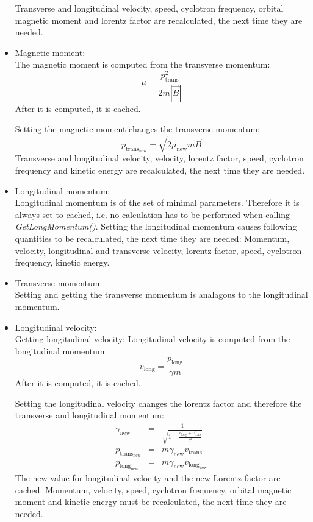 \begin{itemize}
		Transverse and longitudinal velocity, speed, cyclotron frequency, orbital magnetic moment and lorentz factor are recalculated, the next time they are needed.

		\item Magnetic moment:\\
		The magnetic moment is computed from the transverse momentum:
		\begin{equation}
			\mu = \frac{p_{\mathrm{trans}}^{2}}{2 m |\vec{B}|}
		\end{equation}
		After it is computed, it is cached.  
			
		Setting the magnetic moment changes the transverse momentum:
		\begin{equation}
			p_{\mathrm{trans}_{\mathrm{new}}} = \sqrt{2 \mu_{\mathrm{new}} m \vec{B}}
		\end{equation}
		Transverse and longitudinal velocity, velocity, lorentz factor, speed, cyclotron frequency and kinetic energy are recalculated, the next time they are needed.

		\item Longitudinal momentum:\\
		Longitudinal momentum is of the set of minimal parameters. Therefore it is always set to cached, i.e. no calculation has to be performed when calling \textit{GetLongMomentum()}.
		Setting the longitudinal momentum causes following quantities to be recalculated, the next time they are needed:
		Momentum, velocity, longitudinal and transverse velocity, lorentz factor, speed, cyclotron frequency, kinetic energy.
            
		\item Transverse momentum: \\
		Setting and getting the transverse momentum is analagous to the longitudinal momentum.
            
		\item Longitudinal velocity: \\
		Getting longitudinal velocity:
		Longitudinal velocity is computed from the longitudinal momentum:
		\begin{equation}
			v_{\mathrm{long}} = \frac{p_{\mathrm{long}}}{\gamma m}
		\end{equation}
		After it is computed, it is cached. 
			
		Setting the longitudinal velocity changes the lorentz factor and therefore the transverse and longitudinal momentum:
		\begin{eqnarray}
			\gamma_{\mathrm{new}} &=& \frac{1}{\sqrt{1-\frac{v_{\mathrm{long}}^{2}+v_{\mathrm{trans}}^{2}}{c^2}}}\\
			p_{\mathrm{trans}_{\mathrm{new}}} &=& m \gamma_{\mathrm{new}} v_{\mathrm{trans}} \\
			p_{\mathrm{long}_{\mathrm{new}}} &=& m \gamma_{\mathrm{new}} v_{\mathrm{long}_{\mathrm{new}}}
		\end{eqnarray}
		The new value for longitudinal velocity and the new Lorentz factor are cached. 
		Momentum, velocity, speed, cyclotron frequency, orbital magnetic moment and kinetic energy must be recalculated, the next time they are needed. 
                 

\end{itemize}
